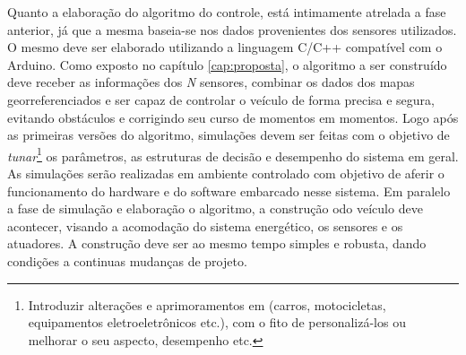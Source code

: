 Quanto a elaboração do algoritmo do controle, está intimamente atrelada a fase anterior, já que a mesma baseia-se nos dados provenientes dos sensores utilizados. O mesmo deve ser elaborado utilizando a linguagem C/C++ compatível com o Arduino. Como exposto no capítulo \ref{cap:proposta}, o algoritmo a ser construído deve receber as informações dos \textit{N} sensores, combinar os dados dos mapas georreferenciados e ser capaz de controlar o veículo de forma precisa e segura, evitando obstáculos e corrigindo seu curso de momentos em momentos. Logo após as primeiras versões do algoritmo, simulações devem ser feitas com o objetivo de \textit{tunar}\footnote{Introduzir alterações e aprimoramentos em (carros, motocicletas, equipamentos eletroeletrônicos etc.), com o fito de personalizá-los ou melhorar o seu aspecto, desempenho etc.} os parâmetros, as estruturas de decisão e desempenho do sistema em geral. As simulações serão realizadas em ambiente controlado com objetivo de aferir o funcionamento do hardware e do software embarcado nesse sistema. Em paralelo a fase de simulação e elaboração o algoritmo, a construção odo veículo deve acontecer, visando a acomodação do sistema energético, os sensores e os atuadores. A construção deve ser ao mesmo tempo simples e robusta, dando condições a continuas mudanças de projeto.

